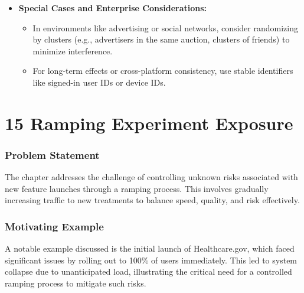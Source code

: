 \documentclass{article}
\begin{document}
\begin{itemize}
    \item \textbf{Special Cases and Enterprise Considerations:}
    \begin{itemize}
        \item In environments like advertising or social networks, consider randomizing by clusters (e.g., advertisers in the same auction, clusters of friends) to minimize interference.
        \item For long-term effects or cross-platform consistency, use stable identifiers like signed-in user IDs or device IDs.
    \end{itemize}
\end{itemize}

\section*{15 Ramping Experiment Exposure}
\subsubsection*{Problem Statement}
The chapter addresses the challenge of controlling unknown risks associated with new feature launches through a ramping process. This involves gradually increasing traffic to new treatments to balance speed, quality, and risk effectively.

\subsubsection*{Motivating Example}
A notable example discussed is the initial launch of Healthcare.gov, which faced significant issues by rolling out to 100\% of users immediately. This led to system collapse due to unanticipated load, illustrating the critical need for a controlled ramping process to mitigate such risks.
\end{document}
